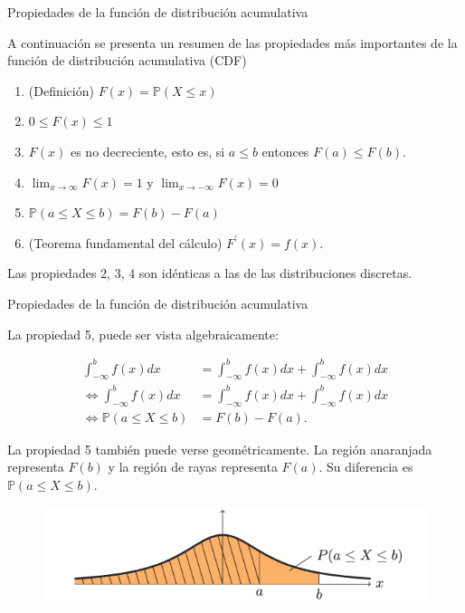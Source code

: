\documentclass[10pt]{beamer}
\begin{document}
\begin{frame}{Propiedades de la funci\'on de distribuci\'on acumulativa}
\small{A continuaci\'on se presenta un resumen de las propiedades m\'as importantes de la funci\'on de distribuci\'on acumulativa (CDF)

\begin{enumerate}
\item (Definici\'on) $F(x) = \mathbb{P}(X \leq x)$
\item $0 \leq F(x) \leq 1$
\item $F(x)$ es no decreciente, esto es, si $a \leq b$ entonces $F(a) \leq F(b)$.
\item $\lim_{x \rightarrow \infty} F(x) =1$ y  $\lim_{x \rightarrow -\infty} F(x) =0$
\item $\mathbb{P}(a \leq X \leq b) = F(b) -F(a)$
\item (Teorema fundamental del c\'alculo) $F^{'}(x) = f(x)$.
\end{enumerate}

Las propiedades $2$, $3$, $4$ son id\'enticas a las de las distribuciones discretas.
	
}
\end{frame}
\begin{frame}{Propiedades de la funci\'on de distribuci\'on acumulativa}
\small{ La propiedad 5, puede ser vista algebraicamente:
	
\begin{align*}
\int_{-\infty}^{b}f(x) dx &= \int_{-\infty}^{b}f(x) dx +  \int_{-\infty}^{b}f(x) dx \\
\Leftrightarrow \int_{-\infty}^{b}f(x) dx &=  \int_{-\infty}^{b}f(x) dx +  \int_{-\infty}^{b}f(x) dx \\
\Leftrightarrow \mathbb{P}(a \leq X \leq b) &= F(b) - F(a).
\end{align*}

\vspace{0.2cm}

La propiedad 5 tambi\'en puede verse geom\'etricamente. La regi\'on anaranjada representa $F(b)$ y la regi\'on de rayas representa $F(a)$. Su diferencia es $\mathbb{P}(a \leq  X \leq b)$.

\begin{figure}[ht]
	\centering
	\includegraphics[scale=.4]{G7.png}
\end{figure}
}
\end{frame}
\end{document}
